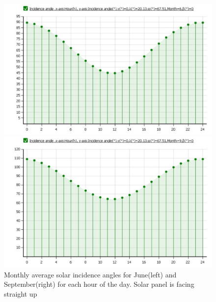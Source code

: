 \begin{figure}[H]
\centering
\begin{minipage}[t]{0.48\linewidth}
\centering
\includegraphics[width=\textwidth]{figures/fig_CDR_EPS_SolarIncidenceAngle_Jun}
\end{minipage}
\begin{minipage}[t]{0.48\linewidth}
\centering
\includegraphics[width=\textwidth]{figures/fig_CDR_EPS_SolarIncidenceAngle_Sep}
\end{minipage}
\caption[Solar Incidence Angles]{Monthly average solar incidence angles for June(left) and September(right) for each hour of the day. Solar panel is facing straight up}
\label{fig:SolarIncidenceAngles}
\end{figure}
%
